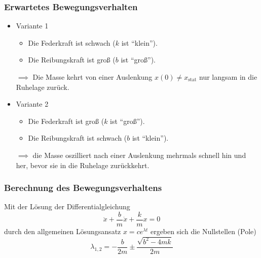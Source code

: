 			\subsubsection{Erwartetes Bewegungsverhalten} %
				\begin{itemize}
					\item Variante 1
						\begin{itemize}
							\item Die Federkraft ist schwach (\(k\) ist \enquote{klein}).
							\item Die Reibungskraft ist groß (\(b\) ist \enquote{groß}).
						\end{itemize}
						\(\implies\) Die Masse kehrt von einer Auslenkung \( x(0) \neq x _ \text{stat} \) nur langsam in die Ruhelage zurück.
					\item Variante 2
						\begin{itemize}
							\item Die Federkraft ist groß (\(k\) ist \enquote{groß}).
							\item Die Reibungskraft ist schwach (\(b\) ist \enquote{klein}).
						\end{itemize}
						\( \implies \) die Masse oszilliert nach einer Auslenkung mehrmals schnell hin und her, bevor sie in die Ruhelage zurückkehrt.
				\end{itemize}
			
			\subsubsection{Berechnung des Bewegungsverhaltens} %
				\label{sec:bewegung}
			
				Mit der Lösung der Differentialgleichung \[ \ddot{x} + \frac{b}{m} \dot{x} + \frac{k}{m} x = 0 \] durch den allgemeinen Lösungsansatz \( x = ce^{\lambda t} \) ergeben sich die Nullstellen (Pole) \[ \lambda _ { 1, 2 } = - \frac{b}{2m} \pm \frac{\sqrt{b^2 - 4mk}}{2m} \]
				
